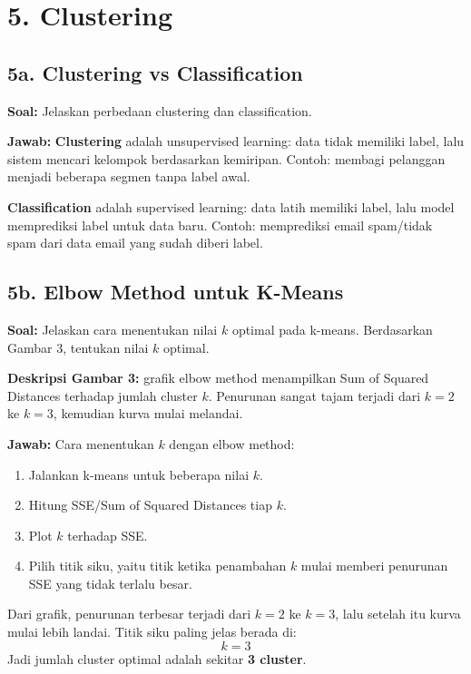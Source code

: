 \documentclass[10pt,a4paper,twocolumn]{article}
\newcommand{\jawab}{\textbf{Jawab: }}
\newcommand{\soal}{\textbf{Soal: }}
\begin{document}
\section*{5. Clustering}

\subsection*{5a. Clustering vs Classification}
\soal Jelaskan perbedaan clustering dan classification.

\jawab \textbf{Clustering} adalah unsupervised learning: data tidak memiliki label, lalu sistem mencari kelompok berdasarkan kemiripan. Contoh: membagi pelanggan menjadi beberapa segmen tanpa label awal.

\textbf{Classification} adalah supervised learning: data latih memiliki label, lalu model memprediksi label untuk data baru. Contoh: memprediksi email spam/tidak spam dari data email yang sudah diberi label.

\subsection*{5b. Elbow Method untuk K-Means}
\soal Jelaskan cara menentukan nilai $k$ optimal pada k-means. Berdasarkan Gambar 3, tentukan nilai $k$ optimal.

\textbf{Deskripsi Gambar 3:} grafik elbow method menampilkan Sum of Squared Distances terhadap jumlah cluster $k$. Penurunan sangat tajam terjadi dari $k=2$ ke $k=3$, kemudian kurva mulai melandai.

\jawab Cara menentukan $k$ dengan elbow method:
\begin{enumerate}
\item Jalankan k-means untuk beberapa nilai $k$.
\item Hitung SSE/Sum of Squared Distances tiap $k$.
\item Plot $k$ terhadap SSE.
\item Pilih titik siku, yaitu titik ketika penambahan $k$ mulai memberi penurunan SSE yang tidak terlalu besar.
\end{enumerate}
Dari grafik, penurunan terbesar terjadi dari $k=2$ ke $k=3$, lalu setelah itu kurva mulai lebih landai. Titik siku paling jelas berada di:
\[
\boxed{k=3}
\]
Jadi jumlah cluster optimal adalah sekitar \textbf{3 cluster}.
\end{document}
